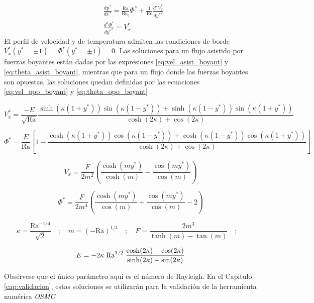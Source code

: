 \begin{align}
&\frac{d \text{p}^* }{d x^*} = \frac{\text{Ra}}{\text{Re}_b } \Phi^* + \frac{1}{\text{Re}} \frac{d^2 V^*_x}{d {y^*}^2} \\
&\frac{d^2 \Phi^*}{ d {y^*}^2 } =  V^*_x
\label{eq:base1}
\end{align}
El perfil de velocidad y de temperatura admiten las condiciones de borde $V^*_x({y^*}= \pm 1) = \Phi^* ({y^*}= \pm 1) = 0 $. Las soluciones para un flujo asistido por fuerzas boyantes están dadas por las expresiones \ref{eq:vel_asist_boyant} y \ref{eq:theta_asist_boyant}, mientras que para un flujo donde las fuerzas boyantes son opuestas, las soluciones quedan definidas por las ecuaciones \ref{eq:vel_opo_boyant} y \ref{eq:theta_opo_boyant} \cite{chen1996linear}. 
\small{
\begin{equation}
V^*_x = \frac{-E}{\sqrt{\text{Ra}}} \frac{\sinh(\kappa(1+y^*))\sin(\kappa(1-y^*)) + \sinh(\kappa(1-y^*))\sin(\kappa(1+y^*)) }{\cosh(2\kappa) + \cos(2\kappa)}
\label{eq:vel_asist_boyant}
\end{equation}

\begin{equation}
\Phi^* = \frac{E}{\text{Ra}} \left[ 1 - \frac{\cosh(\kappa(1+y^*))\cos(\kappa(1-y^*)) + \cosh(\kappa(1-y^*))\cos(\kappa(1+y^*))}{\cosh(2\kappa) + \cos(2\kappa)} \right] 
\label{eq:theta_asist_boyant}
\end{equation}


\begin{equation}
V_x = \frac{F}{2 m^2} \left( \frac{\cosh(m y^*)}{\cosh(m)} - \frac{\cos(m y^*)}{\cos(m)} \right) 
\label{eq:vel_opo_boyant}
\end{equation}

\begin{equation}
\Phi^* = \frac{F}{2 m^4} \left( \frac{\cosh(m y^*)}{\cos(m)} + \frac{\cos(m y^*)}{\cos(m)} - 2 \right) 
\label{eq:theta_opo_boyant}
\end{equation}

\begin{equation*}
\kappa = \frac{\text{Ra}^{-1/4}}{\sqrt{2}} \quad ; \quad m = (-\text{Ra})^{1/4} \quad ; \quad F = \frac{2 m^3}{\tanh(m)-\tan(m)} \quad ; \quad
\end{equation*}

\begin{equation*}
E= -2 \kappa \hspace{1mm} \text{Ra}^{1/2} \hspace{1mm} \frac{\cosh(2\kappa) + \cos(2\kappa)}{\sinh(2\kappa) - \sin(2\kappa)} 
\end{equation*}
}
Obsérvese que el único parámetro aquí es el número de Rayleigh. En el Capitulo \ref{cap:validacion}, estas soluciones se utilizarán para la validación de la herramienta numérica \textit{OSMC}. 

